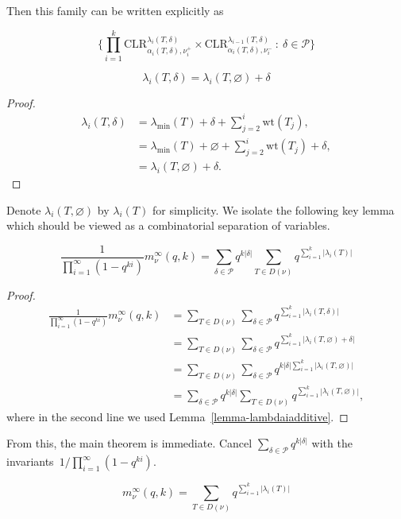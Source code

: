 \documentclass[ALCO,Unicode]{cedram}
\newcommand{\Par}{\mathcal{P}}
\newcommand{\wt}{\text{wt}}
\newcommand{\CLR}{\text{CLR}}
\begin{document}
Then this family can be written explicitly as 

$$ \{\prod_{i=1}^k \CLR^{\lambda_i(T, \delta)}_{\alpha_i(T, \delta), \nu_i^+} \times \CLR^{\lambda_{i-1}(T,\delta)}_{\alpha_i(T,\delta), \nu_i^-} \ : \  \delta \in \Par \} $$

\begin{lemma} \label{lemma-lambdaiadditive}
    $$\lambda_i(T, \delta) = \lambda_i(T, \varnothing) + \delta$$
\end{lemma}
\begin{proof}
    \begin{align*}
    \lambda_i(T, \delta) &= \lambda_{\min}(T) + \delta + \sum_{j=2}^{i} \wt(T_j),\\
    &= \lambda_{\min}(T) + \varnothing + \sum_{j=2}^{i} \wt(T_j) + \delta,\\
    &= \lambda_i(T, \varnothing) + \delta.
    \end{align*}
\end{proof}

Denote $\lambda_i(T, \varnothing)$ by $\lambda_i(T)$ for simplicity. We isolate the following key lemma which should be viewed as a combinatorial separation of variables. 

\begin{lemma}
    $$\frac{1}{\prod_{i=1}^\infty(1-q^{ki})} m_\nu^\infty(q,k) = \sum_{\delta \in \Par} q^{k|\delta|} \sum_{T \in D(\nu)} q^{\sum_{i=1}^k |\lambda_i(T)|}$$
\end{lemma}

\begin{proof}

    \begin{align*}
    \frac{1}{\prod_{i=1}^\infty(1-q^{ki})}m_\nu^\infty(q,k) &= \sum_{T \in D(\nu)} \sum_{\delta \in \Par} q^{\sum_{i=1}^k |\lambda_i(T, \delta)|}\\
    &= \sum_{T \in D(\nu)} \sum_{\delta \in \Par} q^{\sum_{i=1}^k |\lambda_i(T, \varnothing) + \delta|}\\
    &= \sum_{T \in D(\nu)} \sum_{\delta \in \Par} q^{k|\delta|\sum_{i=1}^k |\lambda_i(T, \varnothing)|}\\
    &= \sum_{\delta \in \Par} q^{k|\delta|} \sum_{T \in D(\nu)} q^{\sum_{i=1}^k |\lambda_i(T, \varnothing)|},
    \end{align*}
    where in the second line we used Lemma~\ref{lemma-lambdaiadditive}.
\end{proof}

From this, the main theorem is immediate. Cancel $\sum_{\delta \in \Par} q^{k|\delta|}$ with the invariants~$1/\prod_{i=1}^\infty(1-q^{ki})$.

\begin{thm}\label{thm:main}
     $$m_\nu^\infty(q,k) = \sum_{T \in D(\nu)} q^{\sum_{i=1}^k |\lambda_i(T)|}$$
\end{thm}






\end{document}
